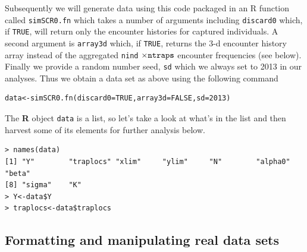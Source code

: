Subsequently we will generate data using this code packaged in an R
function called \mbox{\tt simSCR0.fn} which takes a number of
arguments including \mbox{\tt discard0} which, if \mbox{\tt TRUE}, will return
only the encounter histories for captured individuals.  A second
argument is \mbox{\tt array3d} which, if \mbox{\tt TRUE}, returns the 3-d
encounter history array instead of the aggregated \mbox{\tt nind}
$\times \mbox{\tt ntraps}$ encounter frequencies (see below). Finally
we provide a random number seed, \mbox{\tt sd} which we always set to
2013 in our analyses.  Thus we obtain a data set as above using the
following command
\begin{verbatim}
data<-simSCR0.fn(discard0=TRUE,array3d=FALSE,sd=2013)
\end{verbatim}
The {\bf R} object \mbox{\tt data} is a list, so let's take a look at what's in the list and then harvest some of its elements for further analysis below.
\begin{verbatim}
> names(data)
[1] "Y"        "traplocs" "xlim"     "ylim"     "N"        "alpha0"   "beta"  
[8] "sigma"    "K"       
> Y<-data$Y
> traplocs<-data$traplocs
\end{verbatim}


\subsection{Formatting and manipulating real data sets}
\label{scr0.sec.formats}


